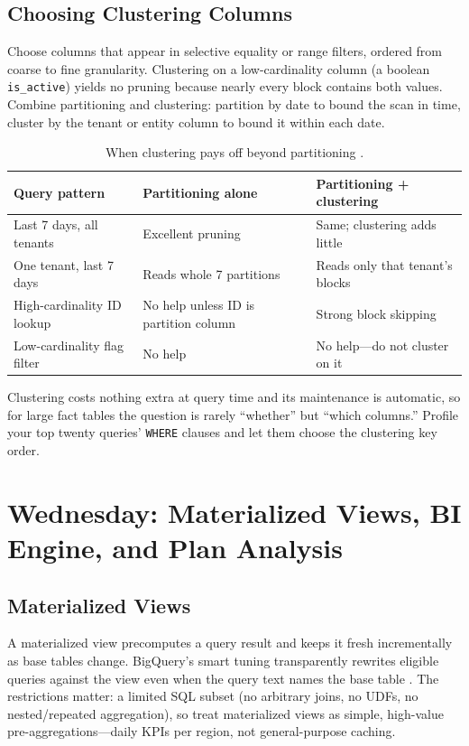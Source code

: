 \subsection{Choosing Clustering Columns}
Choose columns that appear in selective equality or range filters, ordered from coarse to fine granularity. Clustering on a low-cardinality column (a boolean \texttt{is\_active}) yields no pruning because nearly every block contains both values. Combine partitioning and clustering: partition by date to bound the scan in time, cluster by the tenant or entity column to bound it within each date.

\begin{table}[H]
\centering
\small
\begin{tabular}{@{}p{4.2cm}p{4.6cm}p{4.6cm}@{}} \\
\toprule
\textbf{Query pattern} & \textbf{Partitioning alone} & \textbf{Partitioning + clustering} \\
\midrule
Last 7 days, all tenants & Excellent pruning & Same; clustering adds little \\
One tenant, last 7 days & Reads whole 7 partitions & Reads only that tenant's blocks \\
High-cardinality ID lookup & No help unless ID is partition column & Strong block skipping \\
Low-cardinality flag filter & No help & No help---do not cluster on it \\
\bottomrule
\end{tabular}
\caption{When clustering pays off beyond partitioning \cite{googlecloudbigqueryclustering}.}
\label{tab:ch6-clustering-payoff}
\end{table}

\begin{tipbox}
Clustering costs nothing extra at query time and its maintenance is automatic, so for large fact tables the question is rarely ``whether'' but ``which columns.'' Profile your top twenty queries' \texttt{WHERE} clauses and let them choose the clustering key order.
\end{tipbox}

\section{Wednesday: Materialized Views, BI Engine, and Plan Analysis}

\subsection{Materialized Views}
A materialized view precomputes a query result and keeps it fresh incrementally as base tables change. BigQuery's smart tuning transparently rewrites eligible queries against the view even when the query text names the base table \cite{googlecloudbigquerymv}. The restrictions matter: a limited SQL subset (no arbitrary joins, no UDFs, no nested/repeated aggregation), so treat materialized views as simple, high-value pre-aggregations---daily KPIs per region, not general-purpose caching.

